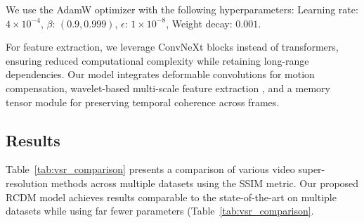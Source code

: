 \documentclass[11pt]{article}
\begin{document}
We use the AdamW optimizer with the following hyperparameters:  
Learning rate: \( 4 \times 10^{-4} \),  
\( \beta \): \( (0.9, 0.999) \),  
\( \epsilon \): \( 1 \times 10^{-8} \),  
Weight decay: \( 0.001 \).

For feature extraction, we leverage ConvNeXt blocks \cite{liu2022convnext} instead of transformers, ensuring reduced computational complexity while retaining long-range dependencies. Our model integrates deformable convolutions \cite{dai2017deformable} for motion compensation, wavelet-based multi-scale feature extraction \cite{huang2024dwtvsr}, and a memory tensor module for preserving temporal coherence across frames.



\subsection{Results}
Table~\ref{tab:vsr_comparison} presents a comparison of various video super-resolution methods across multiple datasets using the SSIM metric. Our proposed RCDM model achieves results comparable to the state-of-the-art on multiple datasets while using far fewer parameters (Table~\ref{tab:vsr_comparison}.
\end{document}

